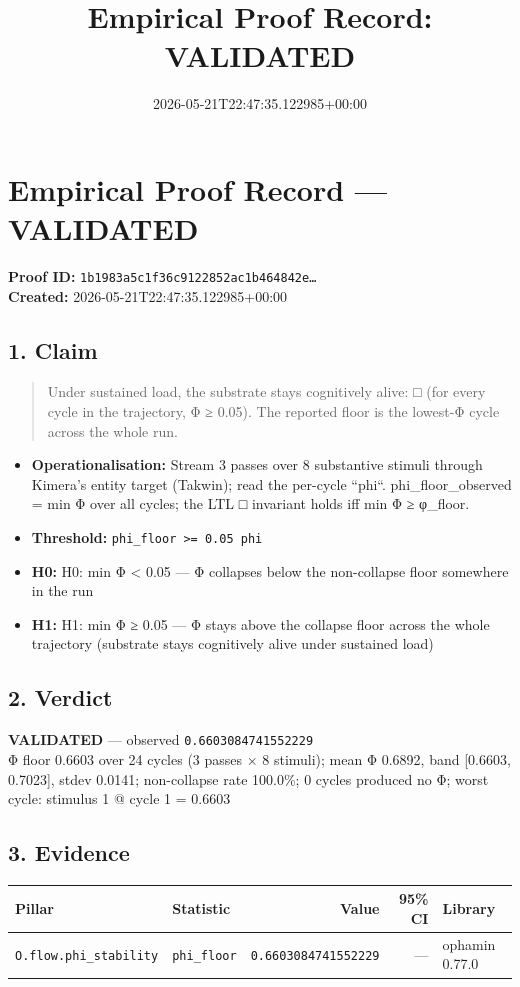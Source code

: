 \documentclass{article}
\title{Empirical Proof Record: VALIDATED}
\date{2026-05-21T22:47:35.122985+00:00}
\begin{document}
\maketitle
\section*{Empirical Proof Record --- \textcolor{validated}{\textbf{VALIDATED}}}
\textbf{Proof ID:} \texttt{1b1983a5c1f36c9122852ac1b464842e\dots}\\
\textbf{Created:} 2026-05-21T22:47:35.122985+00:00
\subsection*{1. Claim}
\begin{quote}Under sustained load, the substrate stays cognitively alive: □ (for every cycle in the trajectory, Φ ≥ 0.05). The reported floor is the lowest-Φ cycle across the whole run.\end{quote}
\begin{itemize}
\item \textbf{Operationalisation:} Stream 3 passes over 8 substantive stimuli through Kimera's entity target (Takwin); read the per-cycle ``phi``. phi\_floor\_observed = min Φ over all cycles; the LTL □ invariant holds iff min Φ ≥ φ\_floor.
\item \textbf{Threshold:} \texttt{phi\_floor >= 0.05 phi}
\item \textbf{H0:} H0: min Φ < 0.05 — Φ collapses below the non-collapse floor somewhere in the run
\item \textbf{H1:} H1: min Φ ≥ 0.05 — Φ stays above the collapse floor across the whole trajectory (substrate stays cognitively alive under sustained load)
\end{itemize}
\subsection*{2. Verdict}
\textcolor{validated}{\textbf{VALIDATED}} --- observed \texttt{0.6603084741552229}\\
Φ floor 0.6603 over 24 cycles (3 passes × 8 stimuli); mean Φ 0.6892, band [0.6603, 0.7023], stdev 0.0141; non-collapse rate 100.0\%; 0 cycles produced no Φ; worst cycle: stimulus 1 @ cycle 1 = 0.6603
\subsection*{3. Evidence}
\begin{tabular}{llrrl}\toprule
\textbf{Pillar} & \textbf{Statistic} & \textbf{Value} & \textbf{95\% CI} & \textbf{Library} \\\midrule
\texttt{O.flow.phi\_stability} & \texttt{phi\_floor} & \texttt{0.6603084741552229} & --- & ophamin 0.77.0 \\
\bottomrule\end{tabular}
\end{document}
